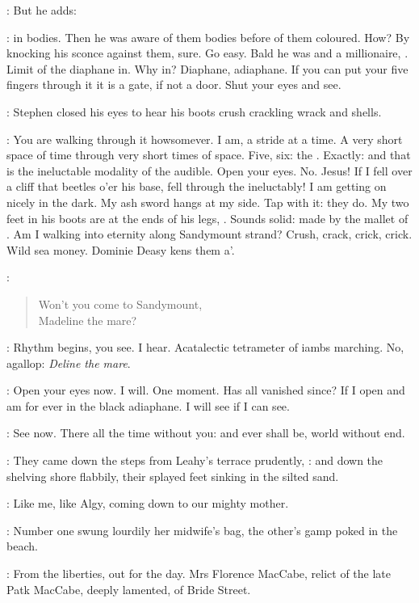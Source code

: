 :
But he adds:

\StephenInt:
in bodies.
Then he was aware of them bodies before of them coloured.
How?
By knocking his sconce against them, sure.
Go easy.
Bald he was and a millionaire,
.
Limit of the diaphane in.
Why in?
Diaphane, adiaphane.
If you can put your five fingers through it it is a gate,
if not a door.
Shut your eyes and see.

:
Stephen closed his eyes to hear his boots
crush crackling wrack and shells.

\StephenInt:
You are walking through it howsomever.
I am, a stride at a time.
A very short space of time through very short times of space.
Five, six: the .
Exactly: and that is the ineluctable modality of the audible.
Open your eyes.
No.
Jesus!
If I fell over a cliff that beetles o'er his base,
fell through the  ineluctably!
I am getting on nicely in the dark.
My ash sword hangs at my side.
Tap with it: they do.
My two feet in his boots are at the ends of his legs, .
Sounds solid:
made by the mallet of .
Am I walking into eternity along Sandymount strand?
Crush, crack, crick, crick.
Wild sea money.
Dominie Deasy kens them a'.

:
\begin{verse}
    Won't you come to Sandymount, \\
    Madeline the mare?
\end{verse}

\StephenInt:
Rhythm begins, you see.
I hear.
Acatalectic tetrameter of iambs marching.
No, agallop:
\emph{Deline the mare}.

\StephenInt:
Open your eyes now.
I will.
One moment.
Has all vanished since?
If I open and am for ever in the black adiaphane.
I will see if I can see.

\StephenInt:
See now.
There all the time without you:
and ever shall be,
world without end.

:
They came down the steps from Leahy's terrace prudently,
:
and down the shelving shore flabbily,
their splayed feet sinking in the silted sand.

\StephenInt:
Like me, like Algy,
coming down to our mighty mother.

:
Number one swung lourdily her midwife's bag,
the other's gamp poked in the beach.

:
From the liberties, out for the day.
Mrs Florence MacCabe,
relict of the late Patk MacCabe, deeply lamented,
of Bride Street.

